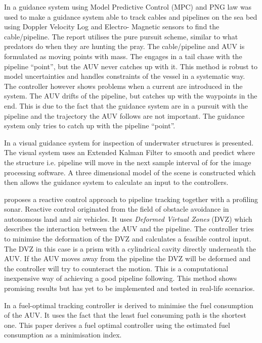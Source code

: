 	In \cite{MPC_pure_pursuit} a guidance system using Model Predictive Control (MPC) and PNG law was used to make 
	a guidance system able to track cables and pipelines on the sea bed using Doppler Velocity Log and Electro-
	Magnetic sensors to find the cable/pipeline. The report utilises the pure pursuit scheme, similar to what 
	predators do when they are hunting the pray. The cable/pipeline and AUV is formulated as moving points
	with mass. The engages in a tail chase with the pipeline ``point'', but the AUV never catches up with it. This 
	method is robust to model uncertainties and handles constraints of the vessel in a systematic way. The
	controller however shows problems when a current are introduced in the system. The AUV drifts of the 
	pipeline, but catches up with the waypoints in the end. This is due to the fact that the guidance
	system are in a pursuit with the pipeline and the trajectory the AUV follows are not important. The
	guidance system only tries to catch up with the pipeline ``point''.
	
	In \cite{Visual_inpsection_of_seabottom_by_AUV} a visual guidance system for inspection of underwater
	structures is presented. The visual system uses an Extended Kalman Filter to smooth and predict where 
	the structure i.e. pipeline will move in the next sample interval of for the image processing software. 
	A three dimensional model of the scene is constructed which then allows the guidance system to calculate 
	an input to the controllers.
	
	\cite{reactive_control_AUV} proposes a reactive control approach to pipeline tracking together with a 
	profiling sonar. Reactive control originated from the field of obstacle avoidance in autonomous land and air 
	vehicles. It uses \textit{Deformed Virtual Zones} (DVZ) which describes the interaction between the AUV and 
	the pipeline. The controller tries to minimise the deformation of the DVZ and calculates a feasible
	control input. The DVZ in this case is a prism with a cylindrical cavity directly underneath the AUV. If the AUV
	moves away from the pipeline the DVZ will be deformed and the controller will try to counteract the 
	motion. This is a computational inexpensive way of achieving a good pipeline following. This 
	method shows promising results but has yet to be implemented and tested in real-life scenarios. 
	
	In \cite{fuel_optimal_control} a fuel-optimal tracking controller is derived to minimise the fuel
	consumption of the AUV. It uses the fact that the least fuel consuming path is the shortest one. This
	paper derives a fuel optimal controller using the estimated fuel consumption as a minimisation index. 

